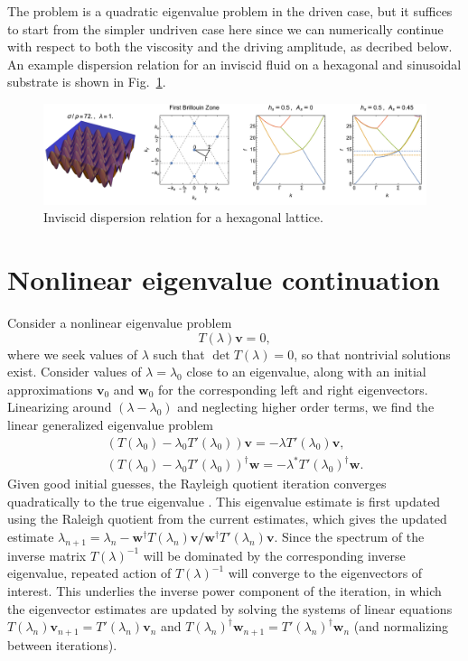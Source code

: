 \documentclass[aps,pre,amsmath,amssymb,floatfix,onecolumn,notitlepage,10pt]{revtex4-1}
\begin{document}
The problem is a quadratic eigenvalue problem in the driven case, but it suffices to start from the simpler undriven case here since we can numerically continue with respect to both the viscosity and the driving amplitude, as decribed below. An example dispersion relation for an inviscid fluid on a hexagonal and sinusoidal substrate is shown in Fig.~\ref{fig1}.
\begin{figure}[hbt]
\includegraphics[width=\columnwidth]{hexagonal}
\caption{Inviscid dispersion relation for a hexagonal lattice. \label{fig1}}
\end{figure}

\section{Nonlinear eigenvalue continuation}
Consider a nonlinear eigenvalue problem
\begin{equation}
T(\lambda) \mathbf{v} = 0,
\end{equation}
where we seek values of $\lambda$ such that $\det T(\lambda)=0$, so that nontrivial solutions exist. Consider values of $\lambda=\lambda_0$ close to an eigenvalue, along with an initial approximations $\mathbf{v}_0$ and $\mathbf{w}_0$ for the corresponding left and right eigenvectors. Linearizing around $(\lambda-\lambda_0)$ and neglecting higher order terms, we find the linear generalized eigenvalue problem
\begin{align}
(T(\lambda_0)-\lambda_0 T'(\lambda_0))\mathbf{v} = -\lambda T'(\lambda_0) \mathbf{v}, \\
(T(\lambda_0)-\lambda_0 T'(\lambda_0))^\dagger \mathbf{w} = -\lambda^* T'(\lambda_0)^\dagger \mathbf{w}.
\end{align}
Given good initial guesses, the Rayleigh quotient iteration converges quadratically to the true eigenvalue \cite{1973_Ruhe}. This eigenvalue estimate is first updated using the Raleigh quotient from the current estimates, which gives  the updated estimate $\lambda_{n+1} = \lambda_n - \mathbf{w}^\dagger T(\lambda_n) \mathbf{v} /  \mathbf{w}^\dagger T'(\lambda_n) \mathbf{v}$. Since the spectrum of the inverse matrix $T(\lambda)^{-1}$ will be dominated by the corresponding inverse eigenvalue, repeated action of $T(\lambda)^{-1}$ will converge to the eigenvectors of interest. This underlies the inverse power component of the iteration, in which the eigenvector estimates are updated by solving the systems of linear equations $T(\lambda_n) \mathbf{v}_{n+1} = T'(\lambda_n)\mathbf{v}_n$ and $T(\lambda_n)^\dagger \mathbf{w}_{n+1} = T'(\lambda_n)^\dagger \mathbf{w}_n$ (and normalizing between iterations). 
\end{document}
